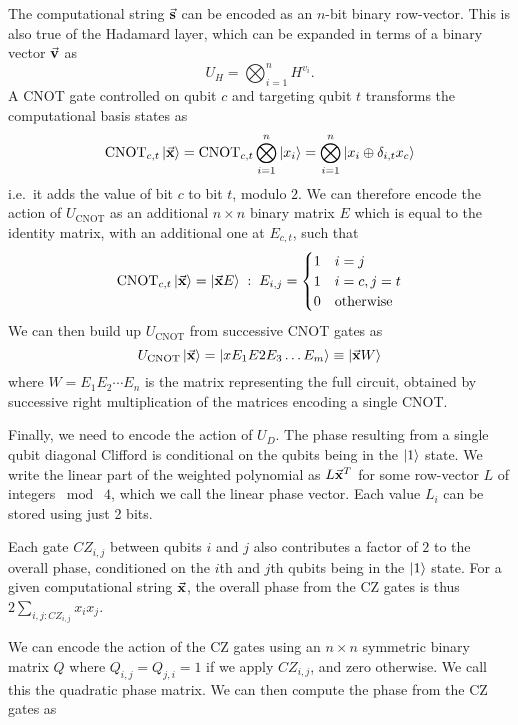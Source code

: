 The computational string $\va{s}$ can be encoded as an $n$-bit binary row-vector. This is also true of the Hadamard layer, which can be expanded in terms of a binary vector $\va{v}$ as
\begin{equation}
U_{H} = \bigotimes_{i=1}^{n} H^{v_{i}}.
\label{eq:binaryhad}
\end{equation}
A CNOT gate controlled on qubit $c$ and targeting qubit $t$ transforms the computational basis states as
\[
\text{CNOT}_{c,t}\ket{\va{x}} = \text{CNOT}_{c,t}\bigotimes_{i=1}^{n}\ket{x_{i}} = \bigotimes_{i=1}^{n}\ket{x_{i}\oplus\delta_{i,t}x_{c}}
\]
i.e.~it adds the value of bit $c$ to bit $t$, modulo $2$. We can therefore encode the action of $U_{\text{CNOT}}$ as an additional $n\times n$ binary matrix $E$ which is equal to the identity matrix, with an additional one at $E_{c,t}$, such that
\begin{equation}
\text{CNOT}_{c,t}\ket{\va{x}} = \ket{\va{x}E}\;:\; E_{i,j}=\begin{cases} 1 & i=j\\ 1 & i=c, j=t \\ 0 & \text{otherwise} \end{cases}
\label{eq:cnot_matrix}
\end{equation}
We can then build up $U_{\text{CNOT}}$ from successive CNOT gates as
\begin{equation}
U_{\text{CNOT}}\ket{\va{x}} = \ket{x E_{1}E{2}E_{3}\dots E_{m}} \equiv \ket{\va{x}W} \label{eq:cnot_matrices}
\end{equation}
where $W=E_{1}E_{2}\cdots E_{n}$ is the matrix representing the full circuit, obtained by successive right multiplication of the matrices encoding a single CNOT.\par
Finally, we need to encode the action of $U_{D}$. The phase resulting from a single qubit diagonal Clifford is conditional on the qubits being in the $\ket{1}$ state. We write the linear part of the weighted polynomial as $L\va{x}^{T}$ for some row-vector $L$ of integers $\bmod\;4$, which we call the linear phase vector. Each value $L_{i}$ can be stored using just 2 bits.\par 
Each gate $CZ_{i,j}$ between qubits $i$ and $j$ also contributes a factor of $2$ to the overall phase, conditioned on the $i$th and $j$th qubits being in the $\ket{1}$ state. For a given computational string $\va{x}$, the overall phase from the CZ gates is thus $2\sum_{i,j : CZ_{i,j}} x_{i}x_{j}$.\par
We can encode the action of the CZ gates using an $n\times n$ symmetric binary matrix $Q$ where $Q_{i,j}=Q_{j,i}=1$ if we apply $CZ_{i,j}$, and zero otherwise. We call this the quadratic phase matrix. We can then compute the phase from the CZ gates as
